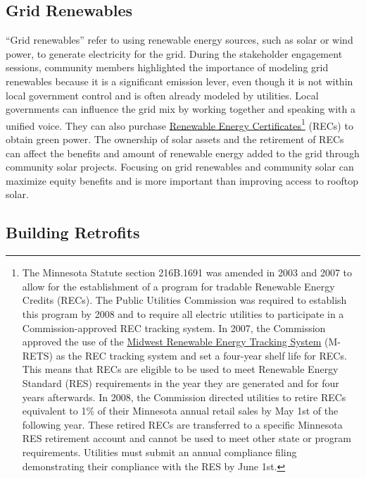 \documentclass[
]{book}
\begin{document}
\hypertarget{grid-renewables}{%
\subsection{Grid Renewables}\label{grid-renewables}}

``Grid renewables'' refer to using renewable energy sources, such as solar or wind power, to generate electricity for the grid. During the stakeholder engagement sessions, community members highlighted the importance of modeling grid renewables because it is a significant emission lever, even though it is not within local government control and is often already modeled by utilities. Local governments can influence the grid mix by working together and speaking with a unified voice. They can also purchase \href{https://www.leg.mn.gov/docs/2019/mandated/190330.pdf}{Renewable Energy Certificates}\footnote{The Minnesota Statute section 216B.1691 was amended in 2003 and 2007 to allow for the establishment of a program for tradable Renewable Energy Credits (RECs). The Public Utilities Commission was required to establish this program by 2008 and to require all electric utilities to participate in a Commission-approved REC tracking system. In 2007, the Commission approved the use of the \href{https://www.mrets.org/}{Midwest Renewable Energy Tracking System} (M-RETS) as the REC tracking system and set a four-year shelf life for RECs. This means that RECs are eligible to be used to meet Renewable Energy Standard (RES) requirements in the year they are generated and for four years afterwards. In 2008, the Commission directed utilities to retire RECs equivalent to 1\% of their Minnesota annual retail sales by May 1st of the following year. These retired RECs are transferred to a specific Minnesota RES retirement account and cannot be used to meet other state or program requirements. Utilities must submit an annual compliance filing demonstrating their compliance with the RES by June 1st.} (RECs) to obtain green power. The ownership of solar assets and the retirement of RECs can affect the benefits and amount of renewable energy added to the grid through community solar projects. Focusing on grid renewables and community solar can maximize equity benefits and is more important than improving access to rooftop solar.

\hypertarget{building-retrofits}{%
\subsection{Building Retrofits}\label{building-retrofits}}
\end{document}
